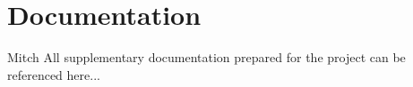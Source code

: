 \chapter{Documentation}
Mitch
All supplementary documentation prepared for the project can be referenced here...
